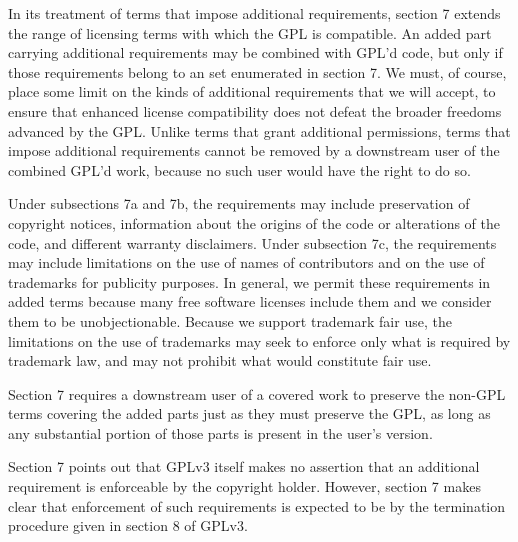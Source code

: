 
In its treatment of terms that impose additional requirements, section 7
extends the range of licensing terms with which the GPL is compatible. An
added part carrying additional requirements may be combined with GPL'd code,
but only if those requirements belong to an set enumerated in section 7. We
must, of course, place some limit on the kinds of additional requirements
that we will accept, to ensure that enhanced license compatibility does not
defeat the broader freedoms advanced by the GPL. Unlike terms that grant
additional permissions, terms that impose additional requirements cannot be
removed by a downstream user of the combined GPL'd work, because no such user
would have the right to do so.


Under subsections 7a and 7b, the requirements may include preservation of
copyright notices, information about the origins of the code or alterations
of the code, and different warranty disclaimers. Under subsection 7c, the
requirements may include limitations on the use of names of contributors and
on the use of trademarks for publicity purposes. In general, we permit these
requirements in added terms because many free software licenses include them
and we consider them to be unobjectionable. Because we support trademark fair
use, the limitations on the use of trademarks may seek to enforce only what
is required by trademark law, and may not prohibit what would constitute fair
use.





Section 7 requires a downstream user of a covered work to preserve the
non-GPL terms covering the added parts just as they must preserve the GPL, as
long as any substantial portion of those parts is present in the user's
version.


Section 7 points out that GPLv3 itself makes no assertion that an additional
requirement is enforceable by the copyright holder.  However, section 7 makes
clear that enforcement of such requirements is expected to be by the
termination procedure given in section 8 of GPLv3.

